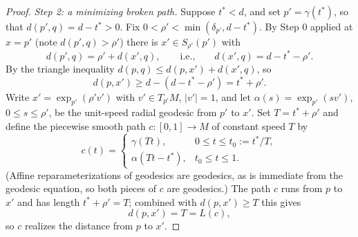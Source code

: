 \begin{proof}
\emph{Step 2: a minimizing broken path.} Suppose $t^*<d$, and set
$p'=\gamma(t^*)$, so that $d(p',q)=d-t^*>0$. Fix
$0<\rho'<\min(\delta_{p'},d-t^*)$. By Step 0 applied at $x=p'$
(note $d(p',q)>\rho'$) there is $x'\in S_{\rho'}(p')$ with
$$d(p',q)=\rho'+d(x',q),\qquad\text{i.e.,}\qquad
d(x',q)=d-t^*-\rho'.$$
By the triangle inequality $d(p,q)\le d(p,x')+d(x',q)$, so
$$d(p,x')\ge d-(d-t^*-\rho')=t^*+\rho'.$$
Write $x'=\exp_{p'}(\rho'v')$ with $v'\in T_{p'}M$, $|v'|=1$, and
let $\alpha(s)=\exp_{p'}(sv')$, $0\le s\le\rho'$, be the
unit-speed radial geodesic from $p'$ to $x'$. Set $T=t^*+\rho'$
and define the piecewise smooth path $c\colon[0,1]\to M$ of
constant speed $T$ by
$$c(t)=\begin{cases}\gamma(Tt),&0\le t\le t_0:=t^*/T,\\
\alpha(Tt-t^*),&t_0\le t\le1.\end{cases}$$
(Affine reparameterizations of geodesics are geodesics, as is
immediate from the geodesic equation, so both pieces of $c$ are
geodesics.) The path $c$ runs from $p$ to $x'$ and has length
$t^*+\rho'=T$; combined with $d(p,x')\ge T$ this gives
$$d(p,x')=T=L(c),$$
so $c$ realizes the distance from $p$ to $x'$.


\end{proof}
